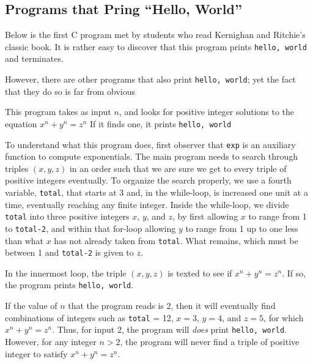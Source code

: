 \documentclass[]{article}
\begin{document}
  \subsection*{Programs that Pring ``Hello, World''}
    Below is the first C program met by students who read Kernighan and 
    Ritchie's classic book. It is rather easy to discover that this program 
    prints \texttt{hello, world} and terminates.
    
      
      
    However, there are other programs that also print \texttt{hello, world}; 
    yet the fact that they do so is far from obvious
    
      
      
    This program takes as input $n$, and looks for positive integer solutions 
    to the equation $x^n + y^n = z^n$ If it finds one, it prints 
    \texttt{hello, world}
    
    To understand what this program does, first observer that \texttt{exp} is 
    an auxiliary function to compute exponentials. The main program needs to 
    search through triples $(x,y,z)$ in an order such that we are sure we get 
    to every triple of positive integers eventually. To organize the search 
    properly, we use a fourth variable, \texttt{total}, that starts at 3 and, 
    in the while-loop, is increased one unit at a time, eventually reaching any 
    finite integer. Inside the while-loop, we divide \texttt{total} into three 
    positive integers $x$, $y$, and $z$, by first allowing $x$ to range from 1 
    to \texttt{total-2}, and within that for-loop allowing $y$ to range from 1 
    up to one less than what $x$ has not already taken from \texttt{total}. 
    What remains, which must be between 1 and \texttt{total-2} is given to $z$.
    
    In the innermost loop, the triple $(x,y,z)$ is texted to see if
    $x^n + y^n = z^n$. If so, the program prints \texttt{hello, world}.
    
    If the value of $n$ that the program reads is 2, then it will eventually 
    find combinations of integers such as \texttt{total} = 12, 
    $x = 3$, $y = 4$,
    and $z = 5$, for which $x^n + y^n = z^n$. Thus, for input 2, the program 
    will \emph{does} print \texttt{hello, world}. However, for any integer 
    $n > 2$, the program will never find a triple of positive integer to 
    satisfy $x^n + y^n = z^n$.
    
\end{document}
